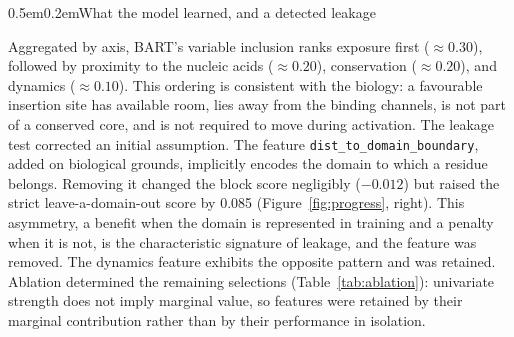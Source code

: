 \documentclass[10pt]{article}
\makeatletter
\renewcommand\section{\@startsection{section}{1}{0pt}%
  {0.5em}{0.2em}{\normalsize\bfseries}}
\makeatother
\begin{document}
\section{What the model learned, and a detected leakage}

Aggregated by axis, BART's variable inclusion ranks exposure first ($\approx0.30$), followed by
proximity to the nucleic acids ($\approx0.20$), conservation ($\approx0.20$), and dynamics
($\approx0.10$). This ordering is consistent with the biology: a favourable insertion site has
available room, lies away from the binding channels, is not part of a conserved core, and is not
required to move during activation. The leakage test corrected an initial assumption. The feature
\texttt{dist\_to\_domain\_boundary}, added on biological grounds, implicitly encodes the domain to
which a residue belongs. Removing it changed the block score negligibly ($-0.012$) but raised the
strict leave-a-domain-out score by 0.085 (Figure~\ref{fig:progress}, right). This asymmetry, a
benefit when the domain is represented in training and a penalty when it is not, is the
characteristic signature of leakage, and the feature was removed. The dynamics feature exhibits the
opposite pattern and was retained. Ablation determined the remaining selections
(Table~\ref{tab:ablation}): univariate strength does not imply marginal value, so features were
retained by their marginal contribution rather than by their performance in isolation.
\end{document}
